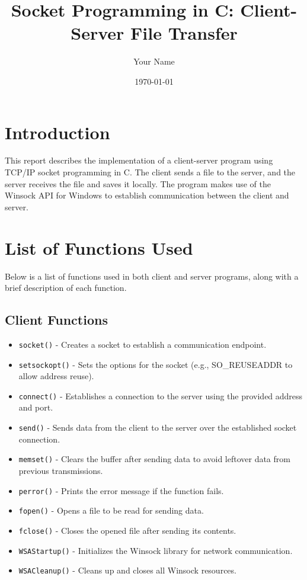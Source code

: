 \documentclass[a4paper,12pt]{article}
\title{Socket Programming in C: Client-Server File Transfer}
\author{Your Name}
\date{\today}
\begin{document}
\maketitle

\section{Introduction}
This report describes the implementation of a client-server program using TCP/IP socket programming in C. The client sends a file to the server, and the server receives the file and saves it locally. The program makes use of the Winsock API for Windows to establish communication between the client and server.

\section{List of Functions Used}
Below is a list of functions used in both client and server programs, along with a brief description of each function.

\subsection{Client Functions}

\begin{itemize}
    \item \texttt{socket()} - Creates a socket to establish a communication endpoint.
    \item \texttt{setsockopt()} - Sets the options for the socket (e.g., SO\_REUSEADDR to allow address reuse).
    \item \texttt{connect()} - Establishes a connection to the server using the provided address and port.
    \item \texttt{send()} - Sends data from the client to the server over the established socket connection.
    \item \texttt{memset()} - Clears the buffer after sending data to avoid leftover data from previous transmissions.
    \item \texttt{perror()} - Prints the error message if the function fails.
    \item \texttt{fopen()} - Opens a file to be read for sending data.
    \item \texttt{fclose()} - Closes the opened file after sending its contents.
    \item \texttt{WSAStartup()} - Initializes the Winsock library for network communication.
    \item \texttt{WSACleanup()} - Cleans up and closes all Winsock resources.
\end{itemize}
\end{document}
